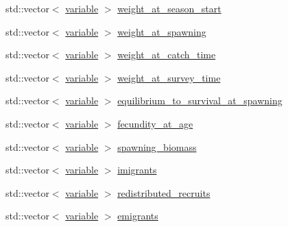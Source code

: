 \begin{DoxyCompactItemize}
std\-::vector$<$ \hyperlink{structmas_1_1_area_population_info_a154b6c5cf71d1241e90b0f0173dbe32c}{variable} $>$ \hyperlink{structmas_1_1_area_population_info_a3c23c29d9a1521625a0a850e2964d966}{weight\-\_\-at\-\_\-season\-\_\-start}
\item 
std\-::vector$<$ \hyperlink{structmas_1_1_area_population_info_a154b6c5cf71d1241e90b0f0173dbe32c}{variable} $>$ \hyperlink{structmas_1_1_area_population_info_a04ce0531dba318eb0da60cc2f5899787}{weight\-\_\-at\-\_\-spawning}
\item 
std\-::vector$<$ \hyperlink{structmas_1_1_area_population_info_a154b6c5cf71d1241e90b0f0173dbe32c}{variable} $>$ \hyperlink{structmas_1_1_area_population_info_a9111e0b85aba10c24a77ced73c9726af}{weight\-\_\-at\-\_\-catch\-\_\-time}
\item 
std\-::vector$<$ \hyperlink{structmas_1_1_area_population_info_a154b6c5cf71d1241e90b0f0173dbe32c}{variable} $>$ \hyperlink{structmas_1_1_area_population_info_ae5bf4e615534e995e26a1be48c9ace1d}{weight\-\_\-at\-\_\-survey\-\_\-time}
\item 
std\-::vector$<$ \hyperlink{structmas_1_1_area_population_info_a154b6c5cf71d1241e90b0f0173dbe32c}{variable} $>$ \hyperlink{structmas_1_1_area_population_info_a61c8acbefc2062274ecf9b4a5acca6d3}{equilibrium\-\_\-to\-\_\-survival\-\_\-at\-\_\-spawning}
\item 
std\-::vector$<$ \hyperlink{structmas_1_1_area_population_info_a154b6c5cf71d1241e90b0f0173dbe32c}{variable} $>$ \hyperlink{structmas_1_1_area_population_info_afcb882cbdf32fc615f9f23af09a51af3}{fecundity\-\_\-at\-\_\-age}
\item 
std\-::vector$<$ \hyperlink{structmas_1_1_area_population_info_a154b6c5cf71d1241e90b0f0173dbe32c}{variable} $>$ \hyperlink{structmas_1_1_area_population_info_a88242109e6eece96d7612b16aaaad5cd}{spawning\-\_\-biomass}
\item 
std\-::vector$<$ \hyperlink{structmas_1_1_area_population_info_a154b6c5cf71d1241e90b0f0173dbe32c}{variable} $>$ \hyperlink{structmas_1_1_area_population_info_ac5d5a79a364772e7a089e4ee6c2d07d8}{imigrants}
\item 
std\-::vector$<$ \hyperlink{structmas_1_1_area_population_info_a154b6c5cf71d1241e90b0f0173dbe32c}{variable} $>$ \hyperlink{structmas_1_1_area_population_info_a53541078254449fb756b436519339f57}{redistributed\-\_\-recruits}
\item 
std\-::vector$<$ \hyperlink{structmas_1_1_area_population_info_a154b6c5cf71d1241e90b0f0173dbe32c}{variable} $>$ \hyperlink{structmas_1_1_area_population_info_aa1d1148625eac638e680972d69d8cc46}{emigrants}

\end{DoxyCompactItemize}
